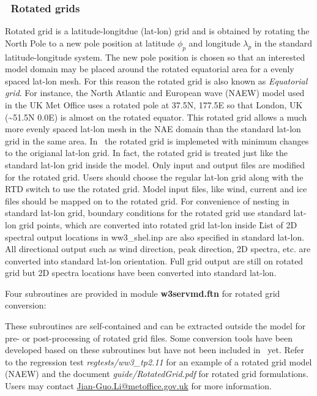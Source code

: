 \vssub
\subsubsection{~Rotated grids} \label{sub:num_space_rotagrid}

\noindent
Rotated grid is a latitude-longitdue (lat-lon) grid and is obtained
by rotating the North Pole to a new pole position at latitude $\phi_{p}$
and longitude $\lambda_{p}$ in the standard latitude-longitude system.
The new pole position is chosen so that an interested model domain
may be placed around the rotated equatorial area for a evenly spaced
lat-lon mesh. For this reason the rotated grid is also known as \emph{Equatorial
grid}. For instance, the North Atlantic and European wave (NAEW) model
used in the UK Met Office uses a rotated pole at 37.5N, 177.5E so
that London, UK (\textasciitilde{}51.5N 0.0E) is almost on the rotated
equator. This rotated grid allows a much more evenly spaced lat-lon
mesh in the NAE domain than the standard lat-lon grid in the same
area. In \ws\, the rotated grid is implemeted with minimum changes
to the origianal lat-lon grid. In fact, the rotated grid is treated
just like the standard lat-lon grid inside the  model. Only input
and output files are modified for the rotated grid. Users should choose
the regular lat-lon grid along with the RTD switch to use the rotated
grid. Model input files, like wind, current and ice files should be
mapped on to the rotated grid. For convenience of nesting in standard
lat-lon grid, boundary conditions for the rotated grid use standard
lat-lon grid points, which are converted into rotated grid lat-lon
inside \ws\. List of 2D spectral output locations in ww3\_shel.inp
are also specified in standard lat-lon. All directional output such
as wind direction, peak direction, 2D spectra, etc. are converted
into standard lat-lon orientation. Full grid output are still on rotated
grid but 2D spectra locations have been converted into standard lat-lon.

Four subroutines are provided in module {\bf w3servmd.ftn} for rotated grid
conversion:
\begin{vlist}
\end{vlist}
These subroutines are self-contained and can be extracted outside
the model for pre- or post-processing of rotated grid files. Some
conversion tools have been developed based on these subroutines but
have not been included in \ws\ yet. Refer to the regression
test \emph{regtests/ww3\_tp2.11} for an example of a rotated grid
model (NAEW) and the document \emph{guide/RotatedGrid.pdf} for rotated
grid formulations. Users may contact \url{Jian-Guo.Li@metoffice.gov.uk}
for more information.
